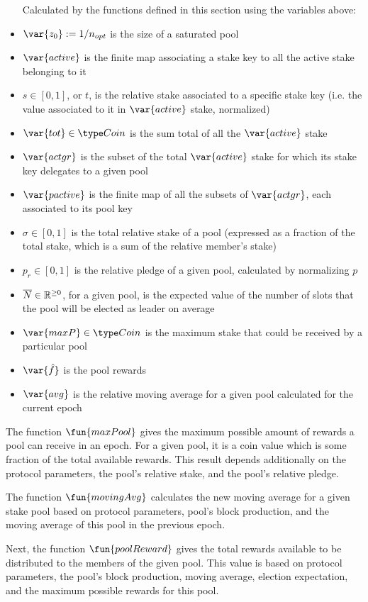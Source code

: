\begin{itemize}
Calculated by the functions defined in this section using the variables above:
\item $\var{z_0} := 1/n_{opt}$ is the size of a saturated pool
\item $\var{active}$ is the finite map associating a stake key to all the
active stake belonging to it
\item $s \in [0,1]$, or $t$, is the relative stake associated to a specific stake key
(i.e. the value associated to it in $\var{active}$ stake, normalized)
\item $\var{tot} \in \Coin$ is the sum total of all the $\var{active}$ stake
\item $\var{actgr}$ is the subset of the total $\var{active}$ stake
for which its stake key delegates to a given pool
\item $\var{pactive}$ is the finite map of all the subsets of $\var{actgr}$,
each associated to its pool key
\item $\sigma \in [0,1]$ is the total relative stake of a pool (expressed as a fraction of
the total stake, which is a sum of the relative member's stake)
\item $p_r \in [0,1]$ is the relative pledge of a given pool, calculated by normalizing $p$
\item $\overline{N} \in \mathbb{R}^{\geq 0}$, for a given pool, is the expected value of the number
of slots that the pool will be elected as leader on average
\item $\var{maxP} \in \Coin$ is the maximum stake that could be received by a particular
pool
\item $\var{\hat{f}}$ is the pool rewards
\item $\var{avg}$ is the relative moving average for a given pool calculated for
the current epoch
\end{itemize}

The function $\fun{maxPool}$ gives the maximum possible amount of rewards a pool
can receive in an epoch. For a given pool, it is a coin value which is some fraction of
the total available rewards. This result depends additionally on the protocol
parameters, the pool's relative stake, and the pool's relative pledge.

The function $\fun{movingAvg}$ calculates the new moving average for a
given stake pool based on protocol parameters, pool's block production, and
the moving average of this pool in the previous epoch.

Next, the function $\fun{poolReward}$ gives the total rewards available to be distributed
to the members of the given pool. This value is based on protocol parameters,
the pool's block production, moving average, election expectation, and the maximum
possible rewards for this pool.

